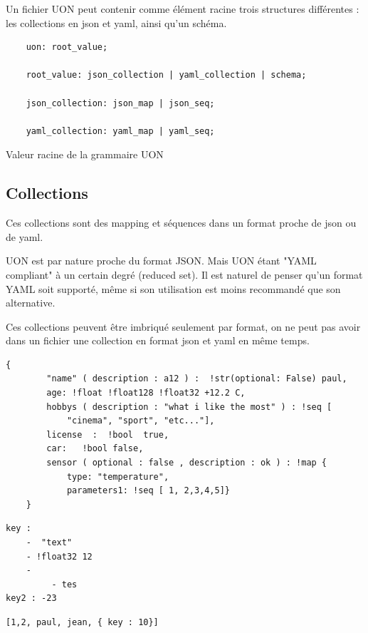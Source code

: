 \documentclass[
    iict, %
    il, %
]{heig-tb}
\begin{document}
Un fichier UON peut contenir comme élément racine trois structures différentes : les collections en json et yaml, ainsi qu'un schéma.

\begin{listing}[!ht]
    \begin{verbatim}
    uon: root_value;

    root_value: json_collection | yaml_collection | schema;

    json_collection: json_map | json_seq;

    yaml_collection: yaml_map | yaml_seq;
    \end{verbatim}
    \caption{Valeur racine de la grammaire UON}
    \label{uon-root-value}
\end{listing}

\subsection{Collections}
Ces collections sont des mapping et séquences dans un format proche de json ou de yaml.

UON est par nature proche du format JSON. Mais UON étant "YAML compliant" à un certain degré (reduced set). Il est naturel de penser qu'un format YAML soit supporté, même si son utilisation est moins recommandé que son alternative.

Ces collections peuvent être imbriqué seulement par format, on ne peut pas avoir dans un fichier une collection en format json et yaml en même temps.

\begin{lstlisting}[frame=single,caption={Exemple d'un mapping en format JSON},captionpos=b,label={json-map}]
    {
        "name" ( description : a12 ) :  !str(optional: False) paul,
        age: !float !float128 !float32 +12.2 C,
        hobbys ( description : "what i like the most" ) : !seq [
            "cinema", "sport", "etc..."],
        license  :  !bool  true,
        car:   !bool false,
        sensor ( optional : false , description : ok ) : !map {
            type: "temperature",
            parameters1: !seq [ 1, 2,3,4,5]}
    }
\end{lstlisting}

\begin{lstlisting}[frame=single,caption={Exemple d'un mapping en format YAML},captionpos=b,label={yaml-map}]
key :
    -  "text"
    - !float32 12
    -
         - tes
key2 : -23
\end{lstlisting}

\begin{lstlisting}[frame=single,caption={Exemple d'une séquence en format JSON},captionpos=b,label={json-seq}]
[1,2, paul, jean, { key : 10}]
\end{lstlisting}
\end{document}
